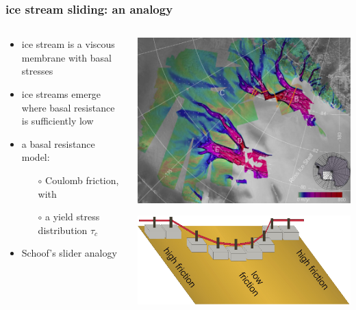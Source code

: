 \documentclass{beamer}
\begin{document}
\begin{frame}
  \frametitle{ice stream sliding: an analogy}

\begin{columns}
\begin{column}{0.6\textwidth}
\begin{itemize}
\item ice stream is a viscous membrane with basal stresses
\item ice streams emerge where basal resistance is sufficiently low
\item a basal resistance model:
  \begin{itemize}
  \item[$\circ$] Coulomb friction, with
  \item[$\circ$] a yield stress distribution $\tau_c$
  \end{itemize}
\item Schoof's slider analogy
\end{itemize}
\end{column}
\begin{column}{0.4\textwidth}
\includegraphics[width=\textwidth]{siple}

\vspace{0.3in}

\includegraphics[width=1.1\textwidth]{schoof-sliders}
\end{column}
\end{columns}
\end{frame}
\end{document}
